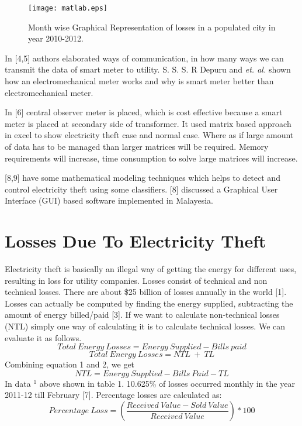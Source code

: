 \documentclass[10pt, conference, compsocconf]{IEEEtran}
\begin{document}
\begin{figure*}[t]
\centering
\texttt{[image: matlab.eps]}
\caption{Month wise Graphical Representation of losses in a populated city in year 2010-2012.}
\end{figure*}

In [4,5] authors elaborated ways of communication, in how many ways we can transmit the data of smart meter to utility. S. S. S. R Depuru and \textit{et. al.} shown how an electromechanical meter works and why is smart meter better than electromechanical meter.

In [6] central observer meter is placed, which is cost effective because a smart meter is placed at secondary side of transformer. It used matrix based approach in excel to show electricity theft case and normal case. Where as if large amount of data has to be managed than larger matrices will be required. Memory requirements will increase, time consumption to solve large matrices will increase.

[8,9] have some mathematical modeling techniques which helps to detect and control electricity theft using some classifiers. [8] discussed a Graphical User Interface (GUI) based software implemented in Malayesia.

\section{Losses Due To Electricity Theft}

Electricity theft is basically an illegal way of getting the energy for different uses, resulting in loss for utility companies. Losses consist of  technical and non technical losses. There are about \$25 billion of losses annually in the world [1]. Losses can actually be computed by finding the energy supplied, subtracting the amount of energy billed/paid [3]. If we want to calculate non-technical losses (NTL) simply one way of calculating it is to calculate technical losses. We can evaluate it as follows.
\begin{equation}
Total\ Energy\ Losses = Energy\ Supplied - Bills\ paid
\end{equation}
\begin{equation}
Total\ Energy\ Losses = NTL\ +\ TL
\end{equation}
Combining equation 1 and 2, we get
\begin{equation}
 NTL = Energy\ Supplied - Bills\ Paid - TL
\end{equation}
In data $^1$ above shown in table 1. 10.625\% of losses occurred monthly in the year 2011-12 till February [7]. Percentage losses are calculated as:
\begin{equation*}
Percentage\ Loss = \left ( \frac{Received\ Value - Sold\ Value}{Received\ Value} \right)*100
\end{equation*}
\end{document}

